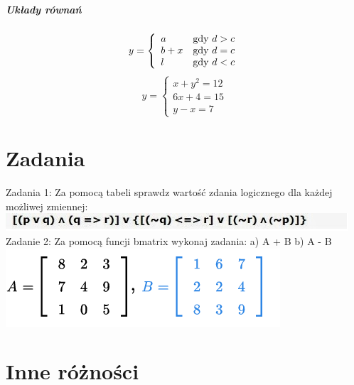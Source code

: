 \documentclass[a4paper]{article}
\begin{document}
\newline
\subparagraph{Układy równań}
$$
y = \left\{ \begin{array}{ll}
a & \textrm{gdy $d>c$}\\
b+x & \textrm{gdy $d=c$}\\
l & \textrm{gdy $ d < c $}
\end{array} \right.
$$
$$
y = \left\{ \begin{array}{ll}
x+y^2 = 12 \\
6x+4 = 15 \\
y-x = 7
\end{array} \right.
$$
\newline
\newpage
\section{Zadania}
Zadania 1:\newline
Za pomocą tabeli sprawdz wartość zdania logicznego dla każdej możliwej zmiennej: 
\includegraphics{zadanie1}
\newline
Zadanie 2:
Za pomocą funcji bmatrix wykonaj zadania: \newline
a) A + B\newline
b) A - B\newline
\includegraphics{zadanie2}
\newline
\section{Inne różności}
\end{document}
